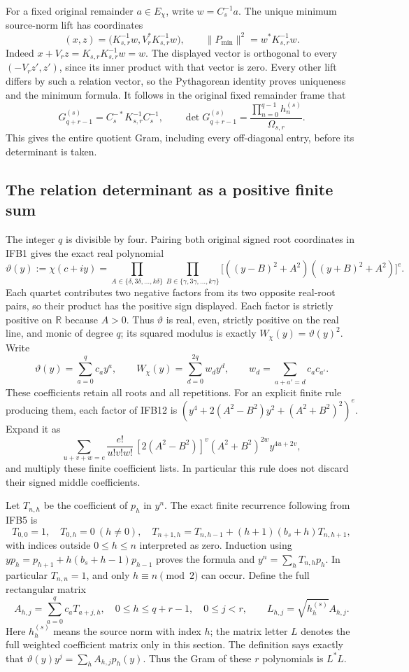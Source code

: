 For a fixed original remainder $a\in E_\chi$, write $w=C_s^{-1}a$.
The unique minimum source-norm lift has coordinates
\[
 (x,z)=\bigl(K_{s,r}^{-1}w, V_r^*K_{s,r}^{-1}w\bigr),
\qquad
 \|P_{\min}\|^2=w^*K_{s,r}^{-1}w.
 \tag{IFB10}
\]
Indeed $x+V_rz=K_{s,r}K_{s,r}^{-1}w=w$. The displayed vector
is orthogonal to every $(-V_rz',z')$, since its inner product with
that vector is zero. Every other lift differs by such a relation
vector, so the Pythagorean identity proves uniqueness and the
minimum formula. It follows in the original fixed remainder frame
that
\[
 G_{q+r-1}^{(s)}=C_s^{-*}K_{s,r}^{-1}C_s^{-1},\qquad
 \det G_{q+r-1}^{(s)}
       =\frac{\prod_{n=0}^{q-1}h_n^{(s)}}{\Omega_{s,r}}.
 \tag{IFB11}
\]
This gives the entire quotient Gram, including every off-diagonal
entry, before its determinant is taken.

\subsection{The relation determinant as a positive finite sum}

The integer $q$ is divisible by four. Pairing both original signed
root coordinates in IFB1 gives the exact real polynomial
\[
 \vartheta(y):=\chi(c+iy)
 =\prod_{A\in\{\delta,3\delta,\ldots,k\delta\}}
   \prod_{B\in\{\gamma,3\gamma,\ldots,k\gamma\}}
 \bigl[((y-B)^2+A^2)((y+B)^2+A^2)\bigr]^e.
 \tag{IFB12}
\]
Each quartet contributes two negative factors from its two opposite
real-root pairs, so their product has the positive sign displayed.
Each factor is strictly positive on $\mathbb R$ because $A>0$.
Thus $\vartheta$ is real, even, strictly positive on the real line,
and monic of degree $q$; its squared modulus is exactly
$W_\chi(y)=\vartheta(y)^2$. Write
\[
 \vartheta(y)=\sum_{a=0}^q c_a y^a,\qquad
 W_\chi(y)=\sum_{d=0}^{2q}w_dy^d,\qquad
 w_d=\sum_{a+a'=d}c_ac_{a'}.
 \tag{IFB13}
\]
These coefficients retain all roots and all repetitions. For an
explicit finite rule producing them, each factor of IFB12 is
$(y^4+2(A^2-B^2)y^2+(A^2+B^2)^2)^e$. Expand it as
\[
 \sum_{u+v+w=e}
 \frac{e!}{u!v!w!}\,[2(A^2-B^2)]^v(A^2+B^2)^{2w}
             y^{4u+2v},
 \tag{IFB14}
\]
and multiply these finite coefficient lists. In particular this rule
does not discard their signed middle coefficients.

Let $T_{n,h}$ be the coefficient of $p_h$ in $y^n$. The exact
finite recurrence following from IFB5 is
\[
 T_{0,0}=1,\quad T_{0,h}=0\ (h\ne0),\quad
 T_{n+1,h}=T_{n,h-1}+(h+1)(b_s+h)T_{n,h+1},
 \tag{IFB15}
\]
with indices outside $0\leq h\leq n$ interpreted as zero. Induction
using $yp_h=p_{h+1}+h(b_s+h-1)p_{h-1}$ proves the formula and
$y^n=\sum_hT_{n,h}p_h$. In particular $T_{n,n}=1$, and only
$h\equiv n\pmod2$ can occur. Define the full rectangular matrix
\[
 A_{h,j}=\sum_{a=0}^q c_aT_{a+j,h},\quad
 0\leq h\leq q+r-1,\quad 0\leq j<r,
 \qquad
 L_{h,j}=\sqrt{h_h^{(s)}}A_{h,j}.
 \tag{IFB16}
\]
Here $h_h^{(s)}$ means the source norm with index $h$; the matrix
letter $L$ denotes the full weighted coefficient matrix only in this
section. The definition says exactly that
$\vartheta(y)y^j=\sum_h A_{h,j}p_h(y)$.
Thus the Gram of these $r$ polynomials is $L^*L$.

